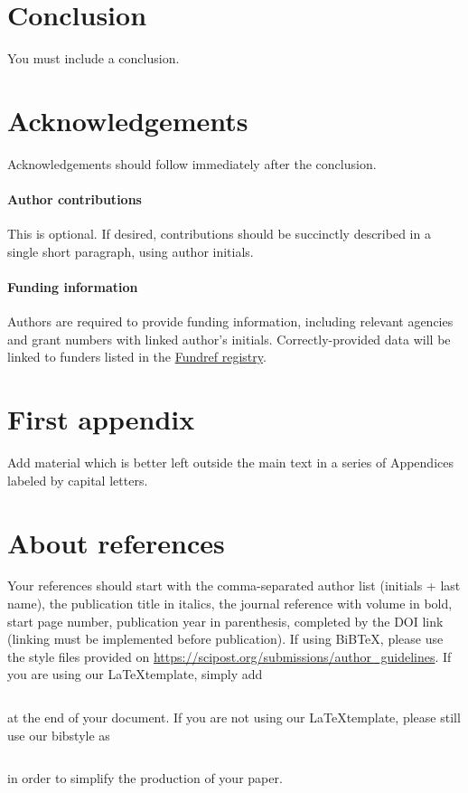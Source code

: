 \documentclass[submission, Phys]{SciPost}
\begin{document}
\section{Conclusion}
You must include a conclusion.

\section*{Acknowledgements}
Acknowledgements should follow immediately after the conclusion.

\paragraph{Author contributions}
This is optional. If desired, contributions should be succinctly described in a single short paragraph, using author initials.

\paragraph{Funding information}
Authors are required to provide funding information, including relevant agencies and grant numbers with linked author's initials. Correctly-provided data will be linked to funders listed in the \href{https://www.crossref.org/services/funder-registry/}{\sf Fundref registry}.


\begin{appendix}

\section{First appendix}
Add material which is better left outside the main text in a series of Appendices labeled by capital letters.

\section{About references}
Your references should start with the comma-separated author list (initials + last name), the publication title in italics, the journal reference with volume in bold, start page number, publication year in parenthesis, completed by the DOI link (linking must be implemented before publication). If using BiBTeX, please use the style files provided  on \url{https://scipost.org/submissions/author_guidelines}. If you are using our \LaTeX template, simply add
\begin{verbatim}

\end{verbatim}
at the end of your document. If you are not using our \LaTeX template, please still use our bibstyle as
\begin{verbatim}

\end{verbatim}
in order to simplify the production of your paper.
\end{appendix}
\end{document}
